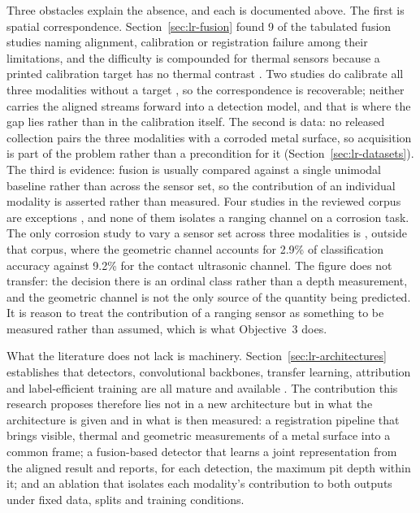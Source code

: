 Three obstacles explain the absence, and each is documented above. The first is
spatial correspondence. Section~\ref{sec:lr-fusion} found 9 of the tabulated
fusion studies naming alignment, calibration or registration failure among their
limitations, and the difficulty is compounded for thermal sensors because a
printed calibration target has no thermal contrast \citep{Yang2024}. Two studies
do calibrate all three modalities without a target \citep{Yang2024,Tran2024}, so
the correspondence is recoverable; neither carries the aligned streams forward
into a detection model, and that is where the gap lies rather than in the
calibration itself. The second is
data: no released collection pairs the three modalities with a corroded metal
surface, so acquisition is part of the problem rather than a precondition for it
(Section~\ref{sec:lr-datasets}). The third is evidence: fusion is usually compared against a
single unimodal baseline rather than across the sensor set, so the contribution
of an individual modality is asserted rather than measured. Four studies in the
reviewed corpus are exceptions
\citep{Hou2024,Haitz2022,Maru2025,Rashidi2026}, and none of them isolates a
ranging channel on a corrosion task. The only corrosion study to vary a sensor
set across three modalities is \citet{Ding2025}, outside that corpus, where the
geometric channel accounts for 2.9\% of classification accuracy against 9.2\%
for the contact ultrasonic channel. The figure does not transfer: the decision
there is an ordinal class rather than a depth measurement, and the geometric
channel is not the only source of the quantity being predicted. It is reason to
treat the contribution of a ranging sensor as something to be measured rather
than assumed, which is what Objective~3 does.

What the literature does not lack is machinery. Section~\ref{sec:lr-architectures}
establishes that detectors, convolutional backbones, transfer learning,
attribution and label-efficient training are all mature and available
\citep{Srivastava2021,Su2024,Moradi2024,Phannakham2026}. The contribution this research proposes therefore lies not in
a new architecture but in what the architecture is given and in what is then
measured: a registration pipeline that brings visible, thermal and geometric
measurements of a metal surface into a common frame; a fusion-based detector
that learns a joint representation from the aligned result and reports, for each
detection, the maximum pit depth within it; and an ablation that isolates each
modality's contribution to both outputs under fixed data, splits and training
conditions.

